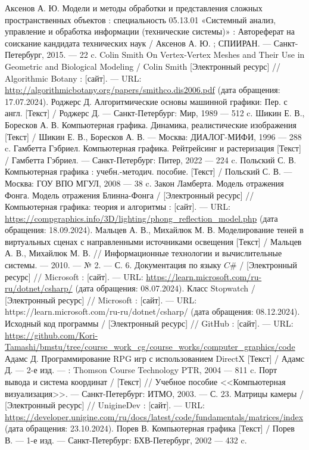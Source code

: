 \begin{thebibliography}{}
	 Аксенов А. Ю. Модели и методы обработки и представления сложных пространственных объектов : специальность 05.13.01 «Системный анализ, управление и обработка  информации (технические системы)» : Автореферат на соискание кандидата технических наук / Аксенов А. Ю. ; СПИИРАН. — Санкт-Петербург, 2015. — 22 c.
	 Colin Smith On Vertex-Vertex Meshes and Their Use in Geometric and Biological Modeling / Colin Smith [Электронный ресурс] // Algorithmic Botany : [сайт]. — URL: \url{http://algorithmicbotany.org/papers/smithco.dis2006.pdf} (дата обращения: 17.07.2024).
	 Роджерс Д. Алгоритмические основы машинной графики: Пер. с англ. [Текст] / Роджерс Д. — Санкт-Петербург: Мир, 1989 — 512 c.
	 Шикин Е. В., Боресков А. В. Компьютерная графика. Динамика, реалистические изображения [Текст] / Шикин Е. В., Боресков А. В. — Москва: ДИАЛОГ-МИФИ, 1996 — 288 c.
	 Гамбетта Гэбриел. Компьютерная графика. Рейтрейсинг и растеризация [Текст] / Гамбетта Гэбриел. — Санкт-Петербург: Питер, 2022 — 224 c.
	 Польский С. В. Компьютерная графика : учебн.-методич. пособие. [Текст] / Польский С. В. — Москва: ГОУ ВПО МГУЛ, 2008 — 38 c.
	 Закон Ламберта. Модель отражения Фонга. Модель отражения Блинна-Фонга /  [Электронный ресурс] // Компьютерная графика: теория и алгоритмы : [сайт]. — URL: \url{https://compgraphics.info/3D/lighting/phong_reflection_model.php} (дата обращения: 18.09.2024).
	 Мальцев А. В., Михайлюк М. В. Моделирование теней в виртуальных сценах с направленными источниками освещения [Текст] / Мальцев А. В., Михайлюк М. В. // Информационные технологии и вычислительные системы. — 2010. — № 2. — С. 6.
	  Документация по языку $C\#$ /  [Электронный ресурс] // Microsoft : [сайт]. — URL: \url{https://learn.microsoft.com/ru-ru/dotnet/csharp/} (дата обращения: 08.07.2024).
	  Класс Stopwatch /  [Электронный ресурс] // Microsoft : [сайт]. — URL: https://learn.microsoft.com/ru-ru/dotnet/csharp/ (дата обращения: 08.12.2024).
	  Исходный код программы /  [Электронный ресурс] // GitHub : [сайт]. — URL: \url{https://github.com/Kori-Tamashi/bmstu/tree/course_work_cg/course_works/computer_graphics/code}
	 Адамс Д. Программирование RPG игр с использованием DirectX [Текст] / Адамс Д. — 2-е изд. — : Thomson Course Technology PTR, 2004 — 811 c.
	 Порт вывода и система координат / [Текст] // Учебное пособие <<Компьютерная визуализация>>. — Санкт-Петербург: ИТМО, 2003. — С. 23.
	  Матрицы камеры /  [Электронный ресурс] // UnigineDev : [сайт]. — URL: \url{https://developer.unigine.com/ru/docs/latest/code/fundamentals/matrices/index} (дата обращения: 23.10.2024).
	 Порев В. Компьютерная графика [Текст] / Порев В. — 1-е изд. — Санкт-Петербург: БХВ-Петербург, 2002 — 432 c.
	
\end{thebibliography}
